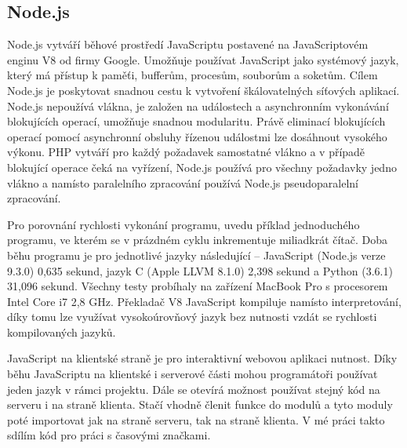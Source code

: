 \subsection{Node.js}
Node.js vytváří běhové prostředí JavaScriptu postavené na JavaScriptovém enginu V8 od firmy Google. Umožňuje používat JavaScript jako systémový jazyk, který má přístup k paměťi, bufferům, procesům, souborům a soketům. Cílem Node.js je poskytovat snadnou cestu k vytvoření škálovatelných síťových aplikací. Node.js nepoužívá vlákna, je založen na událostech a asynchronním vykonávání blokujících operací, umožňuje snadnou modularitu. Právě eliminací blokujících operací pomocí asynchronní obsluhy řízenou událostmi lze dosáhnout vysokého výkonu. PHP vytváří pro každý požadavek samostatné vlákno a v případě blokující operace čeká na vyřízení, Node.js používá pro všechny požadavky jedno vlákno a namísto paralelního zpracování používá Node.js pseudoparalelní zpracování.

Pro porovnání rychlosti vykonání programu, uvedu příklad jednoduchého programu, ve kterém se v prázdném cyklu inkrementuje miliadkrát čítač. Doba běhu programu je pro jednotlivé jazyky následující -- JavaScript (Node.js verze 9.3.0) 0,635 sekund, jazyk C (Apple LLVM 8.1.0) 2,398 sekund a Python (3.6.1) 31,096 sekund. Všechny testy probíhaly na zařízení MacBook Pro s procesorem Intel Core i7 2,8 GHz. Překladač V8 JavaScript kompiluje namísto interpretování, díky tomu lze využívat vysokoúrovňový jazyk bez nutnosti vzdát se rychlosti kompilovaných jazyků.\cite{MasteringNodejs}

JavaScript na klientské straně je pro interaktivní webovou aplikaci nutnost. Díky běhu JavaScriptu na klientské i serverové části mohou programátoři používat jeden jazyk v rámci projektu. Dále se otevírá možnost používat stejný kód na serveru i na straně klienta. Stačí vhodně členit funkce do modulů a tyto moduly poté importovat jak na straně serveru, tak na straně klienta. V mé práci takto sdílím kód pro práci s časovými značkami.

